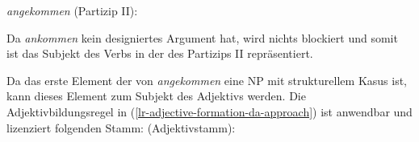 {\eas
\emph{angekommen} (Partizip II):\\
\zs

\noindent
Da \emph{ankommen} kein designiertes Argument hat, wird nichts blockiert und somit ist das Subjekt des
Verbs in der \argstl des Partizips II repräsentiert.

Da das erste Element der \argstl von \emph{angekommen} eine NP mit strukturellem Kasus ist, kann
dieses Element zum Subjekt des Adjektivs werden. Die Adjektivbildungsregel in
(\ref{lr-adjective-formation-da-approach}) ist anwendbar und lizenziert folgenden Stamm:
\eas
{} (Adjektivstamm):\\
\zs

}
